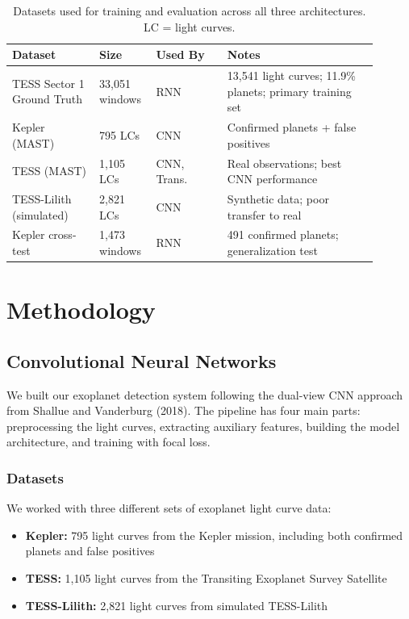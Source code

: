 \documentclass[letterpaper]{article} %
\begin{document}
\begin{table}[t]
\centering
\begin{tabular}{p{0.22\linewidth} p{0.12\linewidth} p{0.18\linewidth} p{0.38\linewidth}}
\hline
\textbf{Dataset} & \textbf{Size} & \textbf{Used By} & \textbf{Notes} \\ \hline
TESS Sector 1 Ground Truth & 33,051 windows & RNN & 13,541 light curves; 11.9\% planets; primary training set \\
Kepler (MAST) & 795 LCs & CNN & Confirmed planets + false positives \\
TESS (MAST) & 1,105 LCs & CNN, Trans. & Real observations; best CNN performance \\
TESS-Lilith (simulated) & 2,821 LCs & CNN & Synthetic data; poor transfer to real \\
Kepler cross-test & 1,473 windows & RNN & 491 confirmed planets; generalization test \\
\hline
\end{tabular}
\caption{Datasets used for training and evaluation across all three architectures. LC = light curves.}
\label{tab:datasets}
\end{table}

\section*{Methodology}
\subsection*{Convolutional Neural Networks}

We built our exoplanet detection system following the dual-view CNN approach from Shallue and Vanderburg (2018). The pipeline has four main parts: preprocessing the light curves, extracting auxiliary features, building the model architecture, and training with focal loss.

\subsubsection{Datasets}

We worked with three different sets of exoplanet light curve data:

\begin{itemize}
    \item \textbf{Kepler:} 795 light curves from the Kepler mission, including both confirmed planets and false positives
    \item \textbf{TESS:} 1,105 light curves from the Transiting Exoplanet Survey Satellite
    \item \textbf{TESS-Lilith:} 2,821 light curves from simulated TESS-Lilith
\end{itemize}
\end{document}
